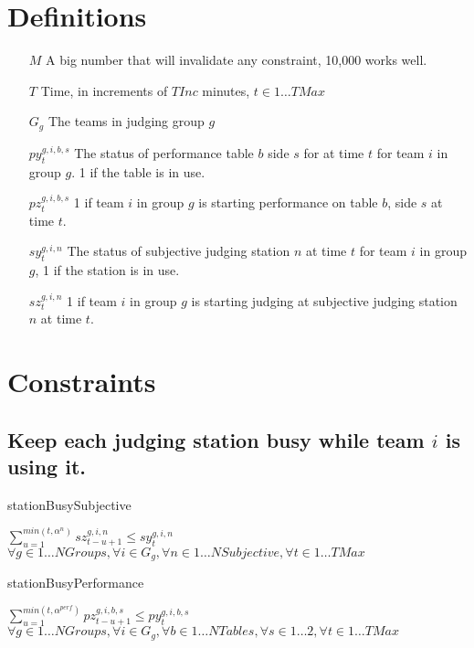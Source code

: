 \documentclass[letterpaper,11pt]{report}
\begin{document}
\section{Definitions}
\begin{itemize}

\item[$M$] A big number that will invalidate any constraint, 10,000 works well.

\item[$T$] Time, in increments of $TInc$ minutes, $t \in 1 \dots TMax$

\item[$G_{g}$] The teams in judging group $g$

\item[$py_{t}^{g,i,b,s}$] The status of performance table $b$ side $s$ for
at time $t$ for team $i$ in group $g$. 1 if the table is in use.  

\item[$pz_{t}^{g,i,b,s}$] 1 if team $i$ in group $g$ is starting performance on table $b$,
  side $s$ at time $t$.

\item[$sy_{t}^{g,i,n}$] The status of subjective judging station $n$ at time $t$ for team
  $i$ in group $g$, 1 if the station is in use.

\item[$sz_{t}^{g,i,n}$] 1 if team $i$ in group $g$ is starting judging at subjective
judging station $n$ at time $t$.


\end{itemize}


\section{Constraints}

\subsection{Keep each judging station busy while team $i$ is using it.}

\begin{algorithm}
\caption{stationBusySubjective}
$\sum\limits_{u=1}^{min(t, \alpha^{n})} sz_{t-u+1}^{g,i,n} \le sy_{t}^{g,i,n}$
\hfill $
\forall g \in 1 \dots NGroups,
\forall i \in G_{g},
\forall n \in 1 \dots NSubjective,
\forall t \in 1 \dots TMax
$
\end{algorithm}

\begin{algorithm}
\caption{stationBusyPerformance}
$\sum\limits_{u=1}^{min(t, \alpha^{perf})} pz_{t-u+1}^{g,i,b,s} \le py_{t}^{g,i,b,s}$
\hfill $
\forall g \in 1 \dots NGroups,
\forall i \in G_{g}, 
\forall b \in 1 \dots NTables,
\forall s \in 1 \dots 2,
\forall t \in 1 \dots TMax
$
\end{algorithm}
\end{document}

